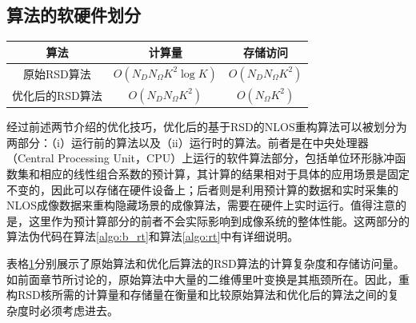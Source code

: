 \documentclass[master]{shtthesis}             %
\begin{document}
\subsection{算法的软硬件划分}\label{sec:sw_hw_sep}

\begin{table}[!t]
    \centering
    \label{tab:fuzadu_comp}
        \begin{tabular}{@{}ccc@{}}
            \toprule
            算法               & 计算量 & 存储访问 \\ \midrule
            原始RSD算法 & $O(N_DN_{\Omega}K^2\log K)$          & $O(N_DN_{\Omega}K^2)$             \\
            优化后的RSD算法& $O(N_DN_{\Omega}K^2)$              & $O(N_{\Omega}K^2)$             \\ \bottomrule
        \end{tabular}%
\end{table}

经过前述两节介绍的优化技巧，优化后的基于RSD的NLOS重构算法可以被划分为两部分：（i）运行前的算法以及（ii）运行时的算法。前者是在中央处理器（Central Processing Unit，CPU）上运行的软件算法部分，包括单位环形脉冲函数集和相应的线性组合系数的预计算，其计算的结果相对于具体的应用场景是固定不变的，因此可以存储在硬件设备上；后者则是利用预计算的数据和实时采集的NLOS成像数据来重构隐藏场景的成像算法，需要在硬件上实时运行。值得注意的是，这里作为预计算部分的前者不会实际影响到成像系统的整体性能。这两部分的算法伪代码在算法\ref{algo:b_rt}和算法\ref{algo:rt}中有详细说明。

表格\ref{tab:fuzadu_comp}分别展示了原始算法和优化后算法的RSD算法的计算复杂度和存储访问量。如前面章节所讨论的，原始算法中大量的二维傅里叶变换是其瓶颈所在。因此，重构RSD核所需的计算量和存储量在衡量和比较原始算法和优化后的算法之间的复杂度时必须考虑进去。
\end{document}
